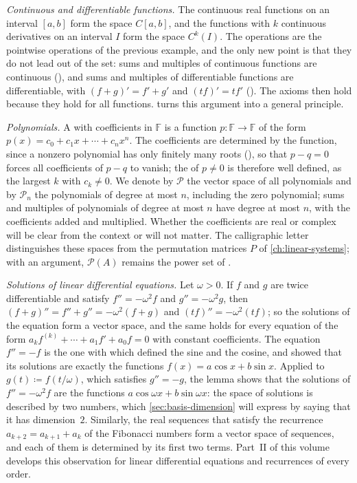 \emph{Continuous and differentiable functions.} The continuous real functions on an interval $[a,b]$ form the space $C[a,b]$, and the functions with $k$ continuous derivatives on an interval $I$ form the space $C^k(I)$. The operations are the pointwise operations of the previous example, and the only new point is that they do not lead out of the set: sums and multiples of continuous functions are continuous (), and sums and multiples of differentiable functions are differentiable, with $(f+g)'=f'+g'$ and $(tf)'=tf'$ (). The axioms then hold because they hold for all functions.  turns this argument into a general principle.

\emph{Polynomials.} A  with coefficients in $\mathbb F$ is a function $p\colon\mathbb F\to\mathbb F$ of the form $p(x)=c_0+c_1x+\cdots+c_nx^n$. The coefficients are determined by the function, since a nonzero polynomial has only finitely many roots (), so that $p-q=0$ forces all coefficients of $p-q$ to vanish; the  of $p\ne0$ is therefore well defined, as the largest $k$ with $c_k\ne0$. We denote by $\mathcal P$ the vector space of all polynomials and by $\mathcal P_n$ the polynomials of degree at most $n$, including the zero polynomial; sums and multiples of polynomials of degree at most $n$ have degree at most $n$, with the coefficients added and multiplied. Whether the coefficients are real or complex will be clear from the context or will not matter. The calligraphic letter distinguishes these spaces from the permutation matrices $P$ of \cref{ch:linear-systems}; with an argument, $\mathcal P(A)$ remains the power set of .

\emph{Solutions of linear differential equations.} Let $\omega>0$. If $f$ and $g$ are twice differentiable and satisfy $f''=-\omega^2f$ and $g''=-\omega^2g$, then $(f+g)''=f''+g''=-\omega^2(f+g)$ and $(tf)''=-\omega^2(tf)$; so the solutions of the equation form a vector space, and the same holds for every equation of the form $a_kf^{(k)}+\cdots+a_1f'+a_0f=0$ with constant coefficients. The equation $f''=-f$ is the one with which  defined the sine and the cosine, and  showed that its solutions are exactly the functions $f(x)=a\cos x+b\sin x$. Applied to $g(t)\coloneqq f(t/\omega)$, which satisfies $g''=-g$, the lemma shows that the solutions of $f''=-\omega^2f$ are the functions $a\cos\omega x+b\sin\omega x$: the space of solutions is described by two numbers, which \cref{sec:basis-dimension} will express by saying that it has dimension~$2$. Similarly, the real sequences that satisfy the recurrence $a_{k+2}=a_{k+1}+a_k$ of the Fibonacci numbers form a vector space of sequences, and each of them is determined by its first two terms. Part~II of this volume develops this observation for linear differential equations and recurrences of every order.

